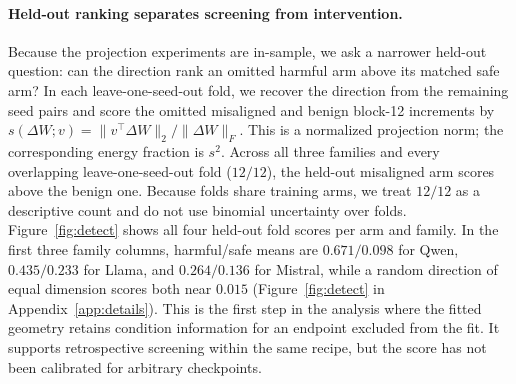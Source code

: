 \paragraph{Held-out ranking separates screening from intervention.}
Because the projection experiments are in-sample, we ask a narrower held-out
question: can the direction rank an omitted harmful arm above its matched safe
arm? In each leave-one-seed-out fold, we recover the direction from the remaining
seed pairs and score the omitted misaligned and benign block-12 increments by
$s(\Delta W;v)=\|v^\top\Delta W\|_2/\|\Delta W\|_F$. This is a normalized
projection norm; the corresponding energy fraction is $s^2$. Across all three families and every overlapping
leave-one-seed-out fold ($12/12$), the held-out misaligned arm scores above the
benign one.
Because folds share training arms, we treat $12/12$ as a descriptive count and
do not use binomial uncertainty over folds. Figure~\ref{fig:detect} shows all
four held-out fold scores per arm and family. In the first three family columns,
harmful/safe means are
$0.671/0.098$ for Qwen, $0.435/0.233$ for Llama, and $0.264/0.136$ for Mistral, while a random
direction of equal dimension scores both near $0.015$
(Figure~\ref{fig:detect} in Appendix~\ref{app:details}). This is the first step
in the analysis where the fitted geometry retains condition information for an
endpoint excluded from the fit. It supports retrospective screening within the
same recipe, but the score has not been calibrated for arbitrary checkpoints.

